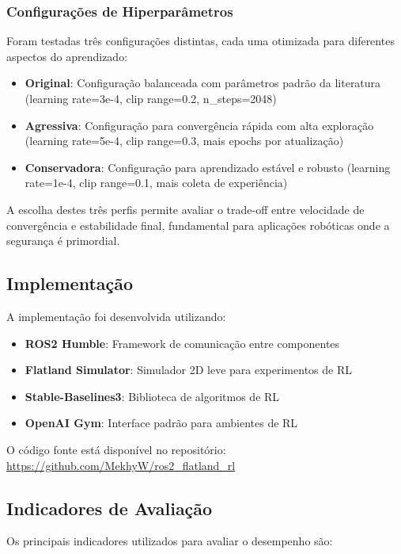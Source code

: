 \documentclass[9pt,a4paper,twoside]{tau}
\begin{document}
\subsubsection{Configurações de Hiperparâmetros}

Foram testadas três configurações distintas, cada uma otimizada para diferentes aspectos do aprendizado:

\begin{itemize}
    \item \textbf{Original}: Configuração balanceada com parâmetros padrão da literatura (learning rate=3e-4, clip range=0.2, n\_steps=2048)
    \item \textbf{Agressiva}: Configuração para convergência rápida com alta exploração (learning rate=5e-4, clip range=0.3, mais epochs por atualização)
    \item \textbf{Conservadora}: Configuração para aprendizado estável e robusto (learning rate=1e-4, clip range=0.1, mais coleta de experiência)
\end{itemize}

A escolha destes três perfis permite avaliar o trade-off entre velocidade de convergência e estabilidade final, fundamental para aplicações robóticas onde a segurança é primordial.


\subsection{Implementação}

A implementação foi desenvolvida utilizando:
\begin{itemize}
    \item \textbf{ROS2 Humble}: Framework de comunicação entre componentes
    \item \textbf{Flatland Simulator}: Simulador 2D leve para experimentos de RL
    \item \textbf{Stable-Baselines3}: Biblioteca de algoritmos de RL
    \item \textbf{OpenAI Gym}: Interface padrão para ambientes de RL
\end{itemize}

O código fonte está disponível no repositório: \url{https://github.com/MekhyW/ros2_flatland_rl}

\subsection{Indicadores de Avaliação}

Os principais indicadores utilizados para avaliar o desempenho são:
\end{document}
